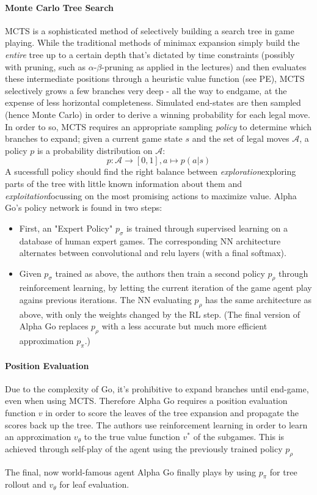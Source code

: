 \documentclass{article}
\theoremstyle{plain}
\theoremstyle{definition}
\theoremstyle{remark}
\begin{document}
\paragraph{Monte Carlo Tree Search}
MCTS is a sophisticated method of selectively building a search tree in game playing. While the traditional methods of minimax expansion simply build the \emph{entire} tree up to a certain depth that's dictated by time constraints (possibly with pruning, such as $\alpha$-$\beta$-pruning as applied in the lectures) and then evaluates these intermediate positions through a heuristic value function (see PE), MCTS selectively grows a few branches very deep - all the way to endgame, at the expense of less horizontal completeness. Simulated end-states are then sampled (hence Monte Carlo) in order to derive a winning probability for each legal move. In order to so, MCTS requires an appropriate sampling \emph{policy} to determine which branches to expand; given a current game state $s$ and the set of legal moves $\mathcal A$, a policy $p$ is a probability distribution on $\mathcal A$: 
$$p: \mathcal A \rightarrow [0,1], a \mapsto p(a|s)$$
A sucessfull policy should find the right balance between \emph{exploration}\textemdash exploring parts of the tree with little known information about them \textemdash and \emph{exploitation}\textemdash focussing on the most promising actions to maximize value. Alpha Go's policy network is found in two steps:
\begin{itemize}
	\item First, an "Expert Policy" $p_\sigma$ is trained through supervised learning on a database of human expert games. The corresponding NN architecture alternates between convolutional and relu layers (with a final softmax).
	\item Given $p_\sigma$ trained as above, the authors then train a second policy $p_\rho$ through reinforcement learning, by letting the current iteration of the game agent play agains previous iterations. The NN evaluating $p_\rho$ has the same architecture as above, with only the weights changed by the RL step. (The final version of Alpha Go replaces $p_\rho$ with a less accurate but much more efficient approximation $p_\pi$.)
\end{itemize}

\paragraph{Position Evaluation}
Due to the complexity of Go, it's prohibitive to expand branches until end-game, even when using MCTS. Therefore Alpha Go requires a position evaluation function $v$ in order to score the leaves of the tree expansion and propagate the scores back up the tree. The authors use reinforcement learning in order to learn an approximation $v_\theta$ to the true value function $v^*$ of the subgames. This is achieved through self-play of the agent using the previously trained policy $p_\rho$

The final, now world-famous agent Alpha Go finally plays by using $p_\pi$ for tree rollout and $v_\theta$ for leaf evaluation.

\nocite{*}

\end{document}
